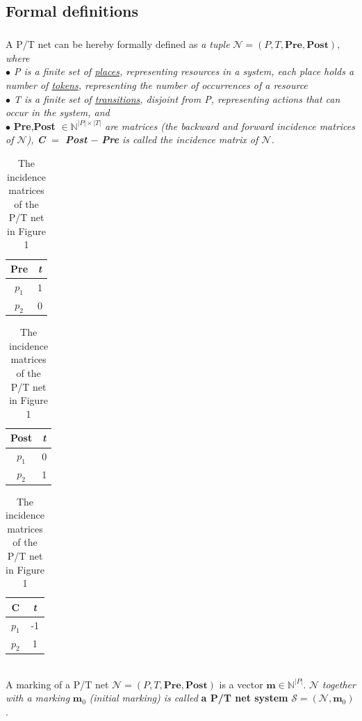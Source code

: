 \documentclass{article}
\begin{document}
	\subsection{Formal definitions\cite{b1}}
	\subparagraph{}A P/T net can be hereby formally defined as\textit{ a tuple} $\mathcal{N} = (P,T,\textbf{Pre},\textbf{Post}),$ \textit{where
		\\$\bullet$ P is a finite set of \underline{places}, representing resources in a system, each place holds a number of \underline{tokens}, representing the number of occurrences of a resource
		\\$\bullet$ T is a finite set of \underline{transitions}, disjoint from P, representing actions that can occur in the system, and} 
		\\$\bullet$ \textbf{Pre},\textbf{Post} $\in\mathbb{N}^{|P|\times|T|}$ \textit{are matrices (the backward and forward incidence matrices of $\mathcal{N}$), \textbf{C} $=$ \textbf{Post} $-$ \textbf{Pre} is called the incidence matrix of $\mathcal{N}$.}
	\begin{table}[h]
		\begin{center}
			\begin{tabular}{ |c|c| } 
				\hline
				\textbf{Pre} & \textit{t}\\
				\hline
				$\textit{p}_{1}$ & 1\\ 
				$\textit{p}_{2}$ & 0\\ 
				\hline
			\end{tabular}
			\begin{tabular}{ |c|c| } 
				\hline
				\textbf{Post} & \textit{t}\\
				\hline
				$\textit{p}_{1}$ & 0\\ 
				$\textit{p}_{2}$ & 1\\ 
				\hline
			\end{tabular}
			\begin{tabular}{ |c|c| } 
				\hline
				\textbf{C} & \textit{t}\\
				\hline
				$\textit{p}_{1}$ & -1\\ 
				$\textit{p}_{2}$ & 1\\ 
				\hline
			\end{tabular}
			\caption{The incidence matrices of the P/T net in Figure 1}			
		\end{center}
	\end{table}
	\\A marking of a P/T net $\mathcal{N} = (P,T,\textbf{Pre},\textbf{Post})$ is a vector $\textbf{m}\in\mathbb{N}^{|P|}$. $\mathcal{N}$ \textit{together with a marking }$\textbf{m}_{0}$ \textit{(initial marking) is called} \textbf{a P/T net system} $\mathcal{S} = (\mathcal{N},\textbf{m}_{0})$. 
\end{document}
